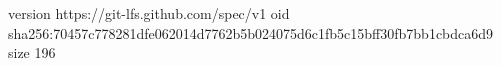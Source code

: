 version https://git-lfs.github.com/spec/v1
oid sha256:70457c778281dfe062014d7762b5b024075d6c1fb5c15bff30fb7bb1cbdca6d9
size 196
